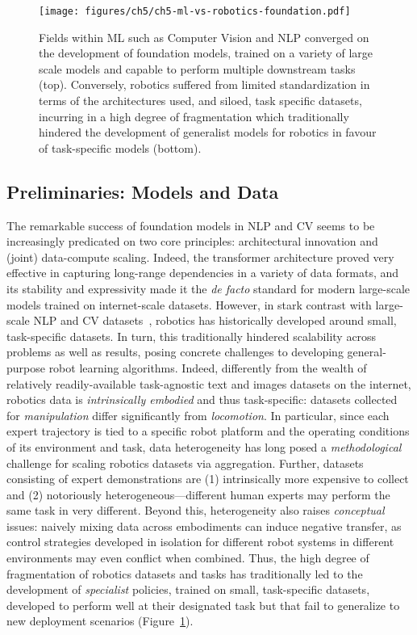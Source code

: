 \begin{figure}
    \centering
    \texttt{[image: figures/ch5/ch5-ml-vs-robotics-foundation.pdf]}
    \caption{Fields within ML such as Computer Vision and NLP converged on the development of foundation models, trained on a variety of large scale models and capable to perform multiple downstream tasks (top). Conversely, robotics suffered from limited standardization in terms of the architectures used, and siloed, task specific datasets, incurring in a high degree of fragmentation which traditionally hindered the development of generalist models for robotics in favour of task-specific models (bottom).}
    \label{fig:ch5-ml-vs-robotics-foundation}
\end{figure}

\subsection{Preliminaries: Models and Data}
The remarkable success of foundation models in NLP and CV seems to be increasingly predicated on two core principles: architectural innovation and (joint) data-compute scaling.
Indeed, the transformer architecture proved very effective in capturing long-range dependencies in a variety of data formats, and its stability and expressivity made it the \emph{de facto} standard for modern large-scale models trained on internet-scale datasets.
However, in stark contrast with large-scale NLP and CV datasets~\citep{raffelExploringLimitsTransfer2023,ImageNet_VSS09}, robotics has historically developed around small, task-specific datasets. 
In turn, this traditionally hindered scalability across problems as well as results, posing concrete challenges to developing general-purpose robot learning algorithms.
Indeed, differently from the wealth of relatively readily-available task-agnostic text and images datasets on the internet, robotics data is \emph{intrinsically embodied} and thus task-specific: datasets collected for \emph{manipulation} differ significantly from \emph{locomotion}.
In particular, since each expert trajectory is tied to a specific robot platform and the operating conditions of its environment and task, data heterogeneity has long posed a \emph{methodological} challenge for scaling robotics datasets via aggregation.
Further, datasets consisting of expert demonstrations are (1) intrinsically more expensive to collect and (2) notoriously heterogeneous---different human experts may perform the same task in very different.
Beyond this, heterogeneity also raises \emph{conceptual} issues: naively mixing data across embodiments can induce negative transfer, as control strategies developed in isolation for different robot systems in different environments may even conflict when combined.
Thus, the high degree of fragmentation of robotics datasets and tasks has traditionally led to the development of \emph{specialist} policies, trained on small, task-specific datasets, developed to perform well at their designated task but that fail to generalize to new deployment scenarios (Figure~\ref{fig:ch5-ml-vs-robotics-foundation}).

